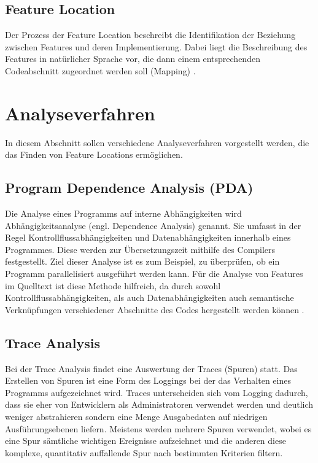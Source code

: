 \documentclass[runningheads,a4paper]{llncs}
\begin{document}
\subsection*{Feature Location}
Der Prozess der Feature Location beschreibt die Identifikation der Beziehung zwischen Features und deren Implementierung. Dabei liegt die Beschreibung des Features in natürlicher Sprache vor, die dann einem entsprechenden Codeabschnitt zugeordnet werden soll (Mapping) \cite{survey}.

\section{Analyseverfahren}

In diesem Abschnitt sollen verschiedene Analyseverfahren vorgestellt werden, die das Finden von Feature Locations ermöglichen.


\subsection*{Program Dependence Analysis (PDA)}\label{PDA}

Die Analyse eines Programms auf interne Abhängigkeiten wird Abhängigkeitsanalyse (engl. Dependence Analysis) genannt. Sie umfasst in der Regel Kontrollflussabhängigkeiten und Datenabhängigkeiten innerhalb eines Programmes. Diese werden zur Übersetzungszeit mithilfe des Compilers festgestellt. Ziel dieser Analyse ist es zum Beispiel, zu überprüfen, ob ein Programm parallelisiert ausgeführt werden kann. Für die Analyse von Features im Quelltext ist diese Methode hilfreich, da durch sowohl Kontrollflussabhängigkeiten, als auch Datenabhängigkeiten auch semantische Verknüpfungen verschiedener Abschnitte des Codes hergestellt werden können \cite{PDA}.

\subsection*{Trace Analysis}
Bei der Trace Analysis findet eine Auswertung der Traces (Spuren) statt. Das Erstellen von Spuren ist eine Form des Loggings bei der das Verhalten eines Programms aufgezeichnet wird. Traces unterscheiden sich vom Logging dadurch, dass sie eher von Entwicklern als Administratoren verwendet werden und deutlich weniger abstrahieren sondern eine Menge Ausgabedaten auf niedrigen Ausführungsebenen liefern. Meistens werden mehrere Spuren verwendet, wobei es eine Spur sämtliche wichtigen Ereignisse aufzeichnet und die anderen diese komplexe, quantitativ auffallende Spur nach bestimmten Kriterien filtern. 
\end{document}
